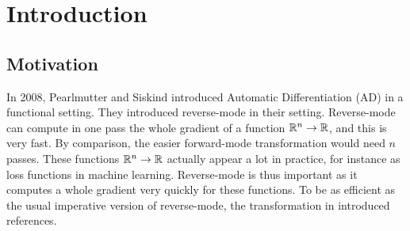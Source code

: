 \section{Introduction}
\label{sec:intro}



\subsection{Motivation}

In 2008, Pearlmutter and Siskind \cite{pearlmutter2008reverse} introduced Automatic Differentiation (AD) in a functional setting. 
They introduced reverse-mode in their setting. 
Reverse-mode can compute in one pass the whole gradient of a function $\mathbb{R}^n\to\mathbb{R}$, and this is very fast.
By comparison, the easier forward-mode transformation would need $n$ passes. 
These functions $\mathbb{R}^n\to\mathbb{R}$ actually appear a lot in practice, for instance as loss functions in machine learning.
Reverse-mode is thus important as it computes a whole gradient very quickly for these functions. 
To be as efficient as the usual imperative version of reverse-mode, the transformation in \cite{pearlmutter2008reverse} introduced references.

